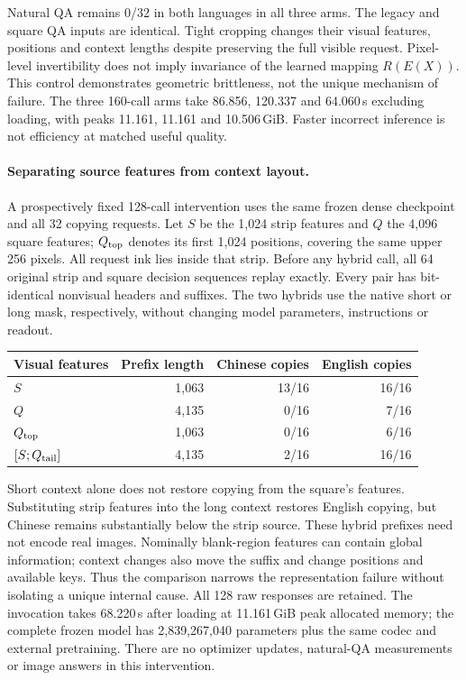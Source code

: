 \documentclass[10pt,a4paper]{article}
\begin{document}
Natural QA remains 0/32 in both languages in all three arms. The legacy and
square QA inputs are identical. Tight cropping changes their visual features,
positions and context lengths despite preserving the full visible request.
Pixel-level invertibility does not imply invariance of the learned mapping
$R(E(X))$. This control demonstrates geometric brittleness, not the unique
mechanism of failure. The three 160-call arms take 86.856, 120.337 and
64.060\,s excluding loading, with peaks 11.161, 11.161 and 10.506\,GiB.
Faster incorrect inference is not efficiency at matched useful quality.

\paragraph{Separating source features from context layout.}
A prospectively fixed 128-call intervention uses the same frozen dense
checkpoint and all 32 copying requests. Let $S$ be the 1,024 strip features
and $Q$ the 4,096 square features; $Q_{\rm top}$ denotes its first 1,024
positions, covering the same upper 256 pixels. All request ink lies inside
that strip. Before any hybrid call, all 64 original strip and square
decision sequences replay exactly. Every pair has bit-identical nonvisual
headers and suffixes. The two hybrids use the native short or long mask,
respectively, without changing model parameters, instructions or readout.

\begin{center}\small
\begin{tabular}{lrrr}
\toprule
Visual features & Prefix length & Chinese copies & English copies\\
\midrule
$S$ & 1,063 & 13/16 & 16/16\\
$Q$ & 4,135 & 0/16 & 7/16\\
$Q_{\rm top}$ & 1,063 & 0/16 & 6/16\\
$[S;Q_{\rm tail}]$ & 4,135 & 2/16 & 16/16\\
\bottomrule
\end{tabular}
\end{center}
Short context alone does not restore copying from the square's features.
Substituting strip features into the long context restores English copying,
but Chinese remains substantially below the strip source. These hybrid
prefixes need not encode real images. Nominally blank-region features can
contain global information; context changes also move the suffix and change
positions and available keys. Thus the comparison narrows the representation
failure without isolating a unique internal cause. All 128 raw responses
are retained. The invocation takes 68.220\,s after loading at 11.161\,GiB
peak allocated memory; the complete frozen model has 2,839,267,040 parameters
plus the same codec and external pretraining. There are no optimizer updates,
natural-QA measurements or image answers in this intervention.
\end{document}
